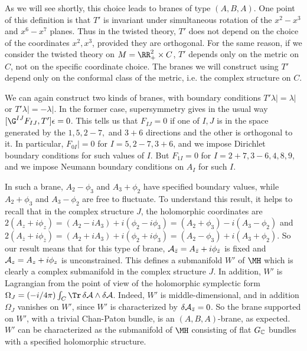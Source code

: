As we will see shortly, this choice leads to branes of type
$(A,B,A)$.  One point of this definition is that $T'$ is invariant
under simultaneous rotation of the $x^2-x^3$ and $x^6-x^7$ planes.
Thus in the twisted theory, $T'$ does not depend on the choice of
the coordinates $x^2,x^3$, provided they are orthogonal. For the
same reason, if we consider the twisted theory on $M=\RR_+^2\times
C$, $T'$ depends only on the metric on $C$, not on the specific
coordinate choice. The branes we will construct using $T'$ depend
only on the conformal class of the metric, i.e. the complex
structure on $C$.

We can again construct two kinds of branes, with boundary
conditions $T'\lambda|=\lambda|$ or $T'\lambda|=-\lambda|$.  In
the former case, supersymmetry gives in the usual way
$[\G^{IJ}F_{IJ},T']\epsilon=0$.  This tells us that $F_{IJ}=0$ if
one of $I,J$ is in the space generated by the $1,5,2-7,$ and $3+6$
directions and the other is orthogonal to it. In particular,
$F_{0I}|=0$ for $I=5,2-7,3+6$, and we impose Dirichlet boundary
conditions for such values of $I$.  But $F_{1I}=0$ for
$I=2+7,3-6,4,8,9$, and we impose Neumann boundary conditions on
$A_I$ for such $I$.

In such a brane, $A_2-\phi_3$ and $A_3+\phi_2$ have specified
boundary values, while $A_2+\phi_3$ and $A_3-\phi_2$ are free to
fluctuate.  To understand this result, it helps to recall that in
the complex structure $J$, the holomorphic coordinates are
$2(A_z+i\phi_z)=(A_2-i A_3)+i(\phi_2-i\phi_3)=(A_2+\phi_3)-i(
A_3-\phi_2)$ and $2(A_{\bar z}+i\phi_{\bar z})=(A_2+i
A_3)+i(\phi_2+i\phi_3)=(A_2-\phi_3)+i( A_3+\phi_2)$.  So our
result means that for this type of brane, ${\cal A}_{\bar
z}=A_{\bar z}+i\phi_{\bar z}$ is fixed and ${\cal A}_{ z}=A_{
z}+i\phi_{ z}$ is unconstrained.  This defines a submanifold $W'$
of $\MH$ which is clearly a complex submanifold in the complex
structure $J$.  In addition, $W'$ is Lagrangian from the point of
view of the holomorphic symplectic form
$\Omega_J=(-i/4\pi)\int_C\Tr\, \delta {\cal A}\wedge \delta {\cal
A}$.   Indeed, $W'$ is middle-dimensional, and in addition
$\Omega_J$ vanishes on $W'$, since $W'$ is characterized by
$\delta {\cal A}_{\bar z}=0$. So the brane supported on $W'$, with
a trivial Chan-Paton bundle, is an $(A,B,A)$-brane, as expected.
$W'$ can be characterized as the submanifold of $\MH$ consisting
of flat $G_{{\Bbb{C}}}$ bundles with a specified holomorphic
structure.

